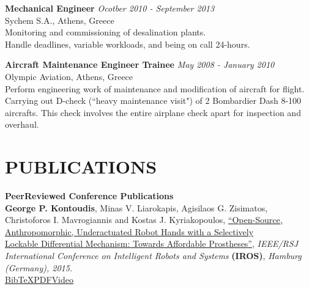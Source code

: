 \documentclass[11pt]{res} %
\begin{document}
\begin{resume}
\small\textbf{Mechanical Engineer} \hfill {\sl Ocotber 2010 - September 2013} 
\\Sychem S.A., Athens, Greece
\\  Monitoring and commissioning of desalination plants.
\\  Handle deadlines, variable workloads, and being on call 24-hours.

\small\textbf{Aircraft Maintenance Engineer Trainee} \hfill {\sl May 2008 - January 2010} \\Olympic Aviation, Athens, Greece
\\  Perform engineering work of maintenance and modification of aircraft for flight.
\\  Carrying out D-check (``heavy maintenance visit") of 2 Bombardier Dash 8-100 aircrafts. This check involves the entire airplane check apart for inspection and overhaul.

\vspace{0.1in} %

\section{PUBLICATIONS}
\vspace{4pt} %
\small\textbf {Peer\textendash{}Reviewed Conference Publications}
\\ \textbf {\rbrack \hspace{0.05cm}}\small\textbf {George P. Kontoudis}, Minas V. Liarokapis, Agisilaos G. Zisimatos, Christoforos I. Mavrogiannis and Kostas J. Kyriakopoulos, \underline{``Open-Source, Anthropomorphic, Underactuated Robot Hands with a Selectively }\\\underline{Lockable Differential Mechanism: Towards Affordable Prostheses''}, {\it  IEEE/RSJ International Conference on Intelligent Robots and Systems} \small\textbf{(IROS)}, {\it Hamburg (Germany), 2015.}
\\\href{http://www.georgekontoudis.com/Publications/Kontoudis2015IROS.bib}
{\lbrack BibTeX\rbrack}\href{http://www.georgekontoudis.com/Publications/IROS2015_Kontoudis_AffordableProstheses.pdf}
{\lbrack PDF\rbrack}\href{https://www.youtube.com/watch?v=LoG_JTOIMO4}{\lbrack Video\rbrack}


\end{resume}
\end{document}
